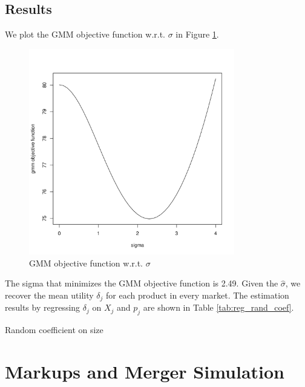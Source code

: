 \documentclass[12pt]{article}[margin=1in]
\begin{document}
\subsection{Results}
We plot the GMM objective function w.r.t. $\sigma$ in Figure
\ref{fig:iv_local_diff}.

\begin{figure}[h!]
    \centering
    \includegraphics[width=0.8\textwidth]{../Results/Figures/gmm_obj_iv_local.pdf}
    \caption{GMM objective function w.r.t. $\sigma$}
    \label{fig:iv_local_diff}
\end{figure}

The sigma that minimizes the GMM objective function is 2.49. Given the
$\hat{\sigma}$, we recover the mean utility $\delta_j$ for each product in
every market. The estimation results by regressing $\delta_j$ on $X_j$ and
$p_j$ are shown in Table \ref{tab:reg_rand_coef}.

\begin{table}[h!]
    \fontsize{10pt}{12pt}\selectfont
    \centering
    
    \caption{Random coefficient on size}
    \label{tab:reg_rand_coef}
\end{table}

\section{Markups and Merger Simulation}
\end{document}
